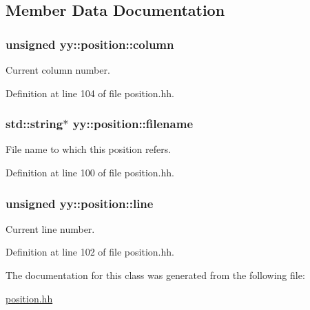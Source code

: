 \subsection{Member Data Documentation}
\hypertarget{classyy_1_1position_a50987537eef62fae7dee8bc8f44740ff}{
\subsubsection[{column}]{\setlength{\rightskip}{0pt plus 5cm}unsigned yy\-::position\-::column}}\label{classyy_1_1position_a50987537eef62fae7dee8bc8f44740ff}


Current column number. 



Definition at line 104 of file position.\-hh.

\hypertarget{classyy_1_1position_a88d2d070ec4751e5d5b1999bb2dc2116}{
\subsubsection[{filename}]{\setlength{\rightskip}{0pt plus 5cm}std\-::string$\ast$ yy\-::position\-::filename}}\label{classyy_1_1position_a88d2d070ec4751e5d5b1999bb2dc2116}


File name to which this position refers. 



Definition at line 100 of file position.\-hh.

\hypertarget{classyy_1_1position_aa5d1bb25307faf0a7d525fba337df80a}{
\subsubsection[{line}]{\setlength{\rightskip}{0pt plus 5cm}unsigned yy\-::position\-::line}}\label{classyy_1_1position_aa5d1bb25307faf0a7d525fba337df80a}


Current line number. 



Definition at line 102 of file position.\-hh.



The documentation for this class was generated from the following file\-:\begin{DoxyCompactItemize}
\item 
\hyperlink{position_8hh}{position.\-hh}\end{DoxyCompactItemize}
